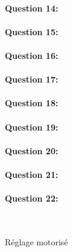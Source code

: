 \paragraph{Question 14:}

\reponse[3]

\paragraph{Question 15:}

\reponse[3]

\paragraph{Question 16:}

\reponse[3]

\paragraph{Question 17:}

\reponse[4]

\paragraph{Question 18:}

\reponse[3]

\paragraph{Question 19:}

\reponse[2]

\paragraph{Question 20:}

\reponse[2]

\paragraph{Question 21:}

\reponse[4]

\newpage

\paragraph{Question 22:}

~\

Réglage motorisé

